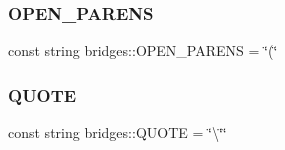 \hypertarget{namespacebridges_ad909fb43b05ef6b7271fddbe85e2742a}{}\label{namespacebridges_ad909fb43b05ef6b7271fddbe85e2742a} 
\subsubsection{\texorpdfstring{O\+P\+E\+N\+\_\+\+P\+A\+R\+E\+NS}{OPEN\_PARENS}}
{\footnotesize\ttfamily const string bridges\+::\+O\+P\+E\+N\+\_\+\+P\+A\+R\+E\+NS = \char`\"{}(\char`\"{}}

\hypertarget{namespacebridges_acd8357e88562cbb7e60bea3fac422ac3}{}\label{namespacebridges_acd8357e88562cbb7e60bea3fac422ac3} 
\subsubsection{\texorpdfstring{Q\+U\+O\+TE}{QUOTE}}
{\footnotesize\ttfamily const string bridges\+::\+Q\+U\+O\+TE = \char`\"{}\textbackslash{}\char`\"{}\char`\"{}}

